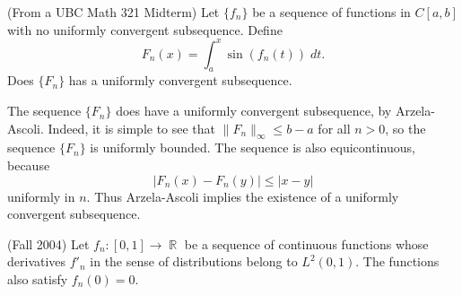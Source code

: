 \documentclass[answers]{exam}
\DeclareMathOperator{\RR}{\mathbb{R}}
\begin{document}
\begin{questions}
\question (From a UBC Math 321 Midterm) Let $\{ f_n \}$ be a sequence of functions in $C[a,b]$ with no uniformly convergent subsequence. Define
%
\[ F_n(x) = \int_a^x \sin(f_n(t))\; dt. \]
%
Does $\{ F_n \}$ has a uniformly convergent subsequence.
\begin{solution}
    The sequence $\{ F_n \}$ does have a uniformly convergent subsequence, by Arzela-Ascoli. Indeed, it is simple to see that $\| F_n \|_\infty \leq b - a$ for all $n > 0$, so the sequence $\{ F_n \}$ is uniformly bounded. The sequence is also equicontinuous, because
    \[ |F_n(x) - F_n(y)| \leq |x - y| \]
    uniformly in $n$. Thus Arzela-Ascoli implies the existence of a uniformly convergent subsequence.
\end{solution}

\question (Fall 2004) Let $f_{n}:[0,1]\to \RR$ be a sequence of continuous functions whose derivatives $f'_{n}$ in the sense of distributions belong to $L^{2}(0,1)$. The functions also satisfy $f_{n}(0)=0$.
\begin{parts}

\end{parts}
\end{questions}
\end{document}

